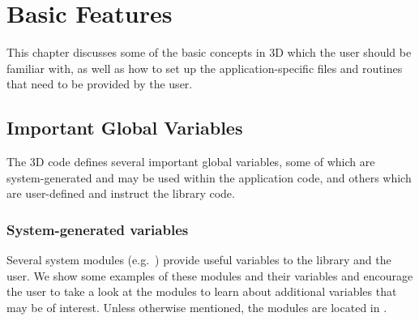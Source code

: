 %
%

\chapter{Basic Features}
\label{chap:basics}


This chapter discusses some of the basic concepts in \hp3D which the user should be familiar with, as well as how to set up the application-specific files and routines that need to be provided by the user.

\section{Important Global Variables}
\label{sec:global-variables}

The \hp3D code defines several important global variables, some of which are system-generated and may be used within the application code, and others which are user-defined and instruct the library code.

\subsection{System-generated variables}

Several system modules (e.g.~) provide useful variables to the library and the user. We show some examples of these modules and their variables and encourage the user to take a look at the modules to learn about additional variables that may be of interest. Unless otherwise mentioned, the modules are located in .


